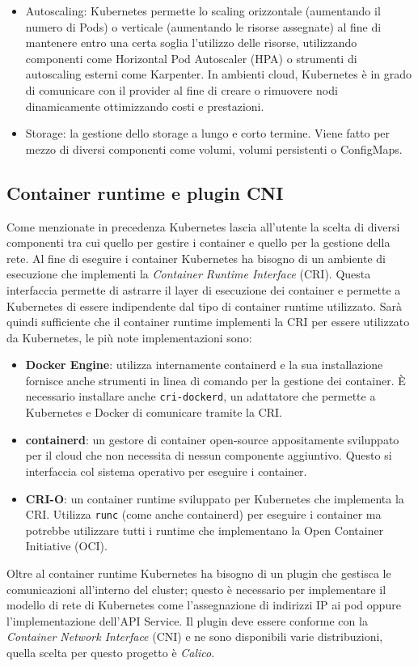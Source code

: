 \documentclass[12pt,a4paper,openright,twoside]{book}
\begin{document}
\begin{itemize}
    \item {
        Autoscaling: Kubernetes permette lo scaling orizzontale (aumentando il numero di Pods) o verticale (aumentando le risorse assegnate) al fine di mantenere entro una certa soglia l'utilizzo delle risorse,
        utilizzando componenti come Horizontal Pod Autoscaler (HPA) o strumenti di autoscaling esterni come Karpenter. 
        In ambienti cloud, Kubernetes è in grado di comunicare con il provider al fine di creare o rimuovere nodi dinamicamente ottimizzando costi e prestazioni.
    }
    \item {
        Storage: la gestione dello storage a lungo e corto termine. Viene fatto per mezzo di diversi componenti come volumi, volumi persistenti o ConfigMaps.
    }
\end{itemize}
\subsection{Container runtime e plugin CNI}
%
%
Come menzionate in precedenza Kubernetes lascia all'utente la scelta di diversi componenti tra cui quello per gestire i container e quello per la gestione della rete\cite{kubernetes}.
Al fine di eseguire i container Kubernetes ha bisogno di un ambiente di esecuzione che implementi la \textit{Container Runtime Interface} (CRI).
Questa interfaccia permette di astrarre il layer di esecuzione dei container e permette a Kubernetes di essere indipendente dal tipo di container runtime utilizzato. 
Sarà quindi sufficiente che il container runtime implementi la CRI per essere utilizzato da Kubernetes, le più note implementazioni sono:
\begin{itemize}
    \item \textbf{Docker Engine}: utilizza internamente containerd e la sua installazione fornisce anche strumenti in linea di comando per la gestione dei container. 
        È necessario installare anche \texttt{cri-dockerd}, un adattatore che permette a Kubernetes e Docker di comunicare tramite la CRI.
    \item \textbf{containerd}: un gestore di container open-source appositamente sviluppato per il cloud che non necessita di nessun componente aggiuntivo. 
        Questo si interfaccia col sistema operativo per eseguire i container.
    \item \textbf{CRI-O}: un container runtime sviluppato per Kubernetes che implementa la CRI. Utilizza \texttt{runc} (come anche containerd) per eseguire i container ma potrebbe utilizzare
        tutti i runtime che implementano la Open Container Initiative (OCI).
\end{itemize}
Oltre al container runtime Kubernetes ha bisogno di un plugin che gestisca le comunicazioni all'interno del cluster; questo è
necessario per implementare il modello di rete di Kubernetes come l'assegnazione di indirizzi IP ai pod oppure l'implementazione dell'API Service.
Il plugin deve essere conforme con la \textit{Container Network Interface} (CNI) e ne sono disponibili varie distribuzioni, quella scelta per questo progetto è
\textit{Calico}.
%
\end{document}
